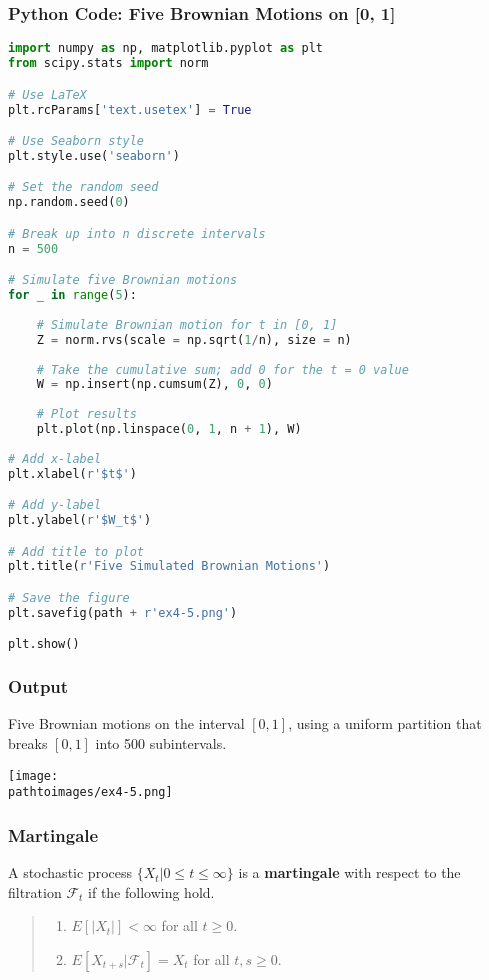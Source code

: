 \documentclass{beamer}
\newcommand{\pathtoimages}{/Users/charlesrambo/Desktop/Bootcamp24/Images}
\begin{document}
\begin{frame}[fragile]
\frametitle{Python Code: Five Brownian Motions on [0, 1]}

\begin{multicols}{2}
\begin{lstlisting}[language=Python]
import numpy as np, matplotlib.pyplot as plt
from scipy.stats import norm

# Use LaTeX
plt.rcParams['text.usetex'] = True

# Use Seaborn style
plt.style.use('seaborn')

# Set the random seed
np.random.seed(0)

# Break up into n discrete intervals
n = 500

# Simulate five Brownian motions
for _ in range(5):
    
    # Simulate Brownian motion for t in [0, 1]
    Z = norm.rvs(scale = np.sqrt(1/n), size = n)
    
    # Take the cumulative sum; add 0 for the t = 0 value
    W = np.insert(np.cumsum(Z), 0, 0)
    
    # Plot results
    plt.plot(np.linspace(0, 1, n + 1), W)
    
# Add x-label
plt.xlabel(r'$t$')

# Add y-label
plt.ylabel(r'$W_t$')

# Add title to plot
plt.title(r'Five Simulated Brownian Motions')

# Save the figure
plt.savefig(path + r'ex4-5.png')

plt.show()
\end{lstlisting}
\end{multicols}
\end{frame}

\begin{frame}
\frametitle{Output}
Five Brownian motions on the interval $[0, 1]$, using a uniform partition that breaks $[0, 1]$ into 500 subintervals. 
\begin{center}
\texttt{[image: \\pathtoimages/ex4-5.png]}
\end{center}

\end{frame}


\begin{frame}
\frametitle{Martingale} 

\begin{Definition}
A stochastic process $\{X_t | 0\leq t \leq\infty\}$ is a {\bf martingale} with respect to the filtration $\mathcal{F}_t$ if the following hold.
\medskip

\begin{quote}
\begin{enumerate}
\item[M.1] $E\left[|X_t|\right] <\infty$ for all $t\geq 0$.
\item[M.2] $E\left[ X_{t + s} | \mathcal{F}_t\right] = X_t$ for all $t, s \geq 0$.
\end{enumerate}
\end{quote}
\end{Definition}

\end{frame}
\end{document}
